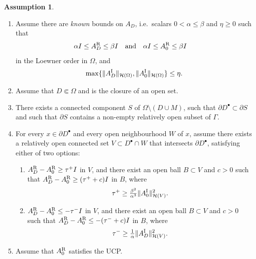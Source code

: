 \documentclass[reqno]{amsart}
\numberwithin{equation}{section}
\numberwithin{figure}{section}
\numberwithin{table}{section}
\theoremstyle{plain}
\theoremstyle{definition}
\newtheorem{assumption}[theorem]{Assumption}
\theoremstyle{remark}
\newcommand{\norm}[1]{\lVert#1\rVert}
\newcommand{\upR}{^{\textup{R}}}
\newcommand{\upI}{^{\textup{I}}}
\newcommand{\AR}{A\upR}
\newcommand{\AI}{A\upI}
\begin{document}
		\begin{assumption}  \label{assump:recon}  {}\
		\begin{enumerate}[\rm(i)]
			\item Assume there are \emph{known} bounds on $A_D$, i.e.\ scalars $0 < \alpha \leq \beta$ and $\eta\geq 0$ such that
			\begin{equation*}
				\alpha I \leq \AR_D \leq \beta I \quad \text{and} \quad \alpha I \leq \AR_0 \leq \beta I \quad
			\end{equation*}
			in the Loewner order in $\Omega$, and
			\begin{equation*}
				\max\{\norm{\AI_D}_{\mathcal{H}(\Omega)}, \norm{\AI_0}_{\mathcal{H}(\Omega)}\} \leq \eta.
			\end{equation*}
			\item Assume that $D\Subset \Omega$ and is the closure of an open set.
			\item There exists a connected component $S$ of $\Omega\setminus(D\cup M)$, such that $\partial D^\bullet \subset\partial S$ and such that $\partial S$ contains a non-empty relatively open subset of $\Gamma$.
			\item For every $x\in\partial D^\bullet$ and every open neighbourhood $W$ of $x$, assume there exists a relatively open connected set $V\subset D^\bullet\cap W$ that intersects $\partial D^\bullet$, satisfying either of two options:
			\begin{enumerate}[\rm(a)]
				\item $\AR_D - \AR_0 \geq \tau^+ I$ in $V$, and there exist an open ball $B\subset V$ and $c>0$ such that $\AR_D - \AR_0 \geq (\tau^+ + c)I$ in $B$, where
				\begin{equation*}
					\tau^+ \geq \tfrac{\beta^2}{\alpha^3}\norm{\AI_0}_{\mathcal{H}(V)}^2.
				\end{equation*}
				\item $\AR_D - \AR_0 \leq -\tau^- I$ in $V$, and there exist an open ball $B\subset V$ and $c>0$ such that $\AR_D - \AR_0 \leq -(\tau^- + c)I$ in $B$, where
				\begin{equation*}
					\tau^- \geq \tfrac{1}{\alpha}\norm{\AI_D}_{\mathcal{H}(V)}^2.
				\end{equation*}
			\end{enumerate}
			\item Assume that $\AR_0$ satisfies the UCP.
		\end{enumerate}
	\end{assumption}
	
\end{document}
